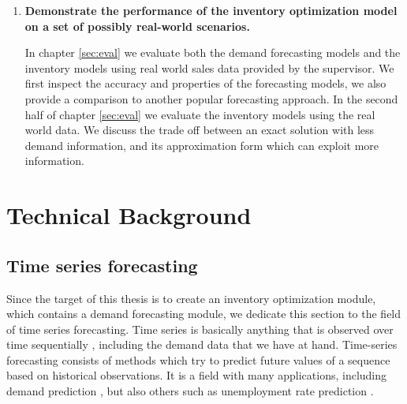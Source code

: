 \documentclass[11pt,a4paper]{article}
\begin{document}
\begin{enumerate}
\item \textbf{Demonstrate the performance of the inventory optimization model on a set of possibly real-world scenarios.}

In chapter \ref{sec:eval} we evaluate both the demand forecasting models and the inventory models using real world sales data provided by the supervisor. We first inspect the accuracy and properties of the forecasting models, we also provide a comparison to another popular forecasting approach. In the second half of chapter \ref{sec:eval} we evaluate the inventory models using the real world data. We discuss the trade off between an exact solution with less demand information, and its approximation form which can exploit more information.
\end{enumerate}
\newpage

\section{Technical Background}

\subsection{Time series forecasting}
\label{sec:pred_theory}
Since the target of this thesis is to create an inventory optimization module, which contains a demand forecasting module, we dedicate this section to the field of time series forecasting. Time series is basically anything that is observed over time sequentially \cite{hyndman2014forecasting}, including the demand data that we have at hand.
Time-series forecasting consists of methods which try to predict future values of a sequence based on historical observations. It is a field with many applications, including demand prediction \cite{brown1957exponential}, but also others such as unemployment rate prediction \cite{unempl}.
\end{document}
